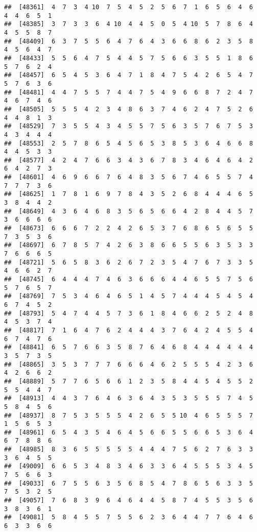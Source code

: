 \documentclass[
]{book}
\begin{document}
\begin{verbatim}
##  [48361]  4  7  3  4 10  7  5  4  5  2  5  6  7  1  6  5  6  4  6  4  4  6  5  1
##  [48385]  3  7  3  3  6  4 10  4  4  5  0  5  4 10  5  7  8  6  4  4  5  5  8  7
##  [48409]  6  3  7  5  5  6  4  7  6  4  3  6  6  8  6  2  3  5  8  4  5  6  4  7
##  [48433]  5  5  6  4  7  5  4  4  5  7  5  6  6  3  5  5  1  8  6  5  7  6  2  4
##  [48457]  6  5  4  5  3  6  4  7  1  8  4  7  5  4  2  6  5  4  7  5  7  6  3  6
##  [48481]  4  4  7  5  5  7  4  4  7  5  4  9  6  6  8  7  2  4  7  4  6  7  4  6
##  [48505]  5  5  5  4  2  3  4  8  6  3  7  4  6  2  4  7  5  2  6  4  4  8  1  3
##  [48529]  7  3  5  5  4  3  4  5  5  7  5  6  3  5  7  6  7  5  3  4  3  4  4  4
##  [48553]  2  5  7  8  6  5  4  5  6  5  3  8  5  3  6  4  6  6  8  4  4  5  3  3
##  [48577]  4  2  4  7  6  6  3  4  3  6  7  8  3  4  6  4  6  4  2  6  4  2  7  3
##  [48601]  4  6  9  6  6  7  6  4  8  3  5  6  7  4  6  5  5  7  4  7  7  7  3  6
##  [48625]  1  7  8  1  6  9  7  8  4  3  5  2  6  8  4  4  4  6  5  3  8  4  4  2
##  [48649]  4  3  6  4  6  8  3  5  6  5  6  6  4  2  8  4  4  5  7  3  6  6  6  6
##  [48673]  6  6  6  7  2  2  4  2  6  5  3  7  6  8  6  5  6  5  5  7  3  5  3  6
##  [48697]  6  7  8  5  7  4  2  6  3  8  6  6  5  5  6  3  5  3  3  7  6  6  6  5
##  [48721]  5  6  5  8  3  6  2  6  7  2  3  5  4  7  6  7  3  3  5  4  6  6  2  7
##  [48745]  6  4  4  4  7  4  6  3  6  6  6  4  4  6  5  5  7  5  6  5  7  6  5  7
##  [48769]  7  5  3  4  6  4  6  5  1  4  5  7  4  4  4  5  4  5  4  6  7  4  5  2
##  [48793]  5  4  7  4  4  5  7  3  6  1  8  4  6  6  2  5  2  4  8  4  5  3  7  4
##  [48817]  7  1  6  4  7  6  2  4  4  4  3  7  6  4  2  4  5  5  4  6  7  4  7  6
##  [48841]  6  5  7  6  6  3  5  8  7  6  4  6  8  4  4  4  4  4  4  3  5  7  3  5
##  [48865]  3  5  3  7  7  7  6  6  6  4  6  2  5  5  5  4  2  3  6  4  2  6  6  2
##  [48889]  5  7  7  6  5  6  6  1  2  3  5  8  4  4  5  4  5  5  2  5  5  4  4  7
##  [48913]  4  4  3  7  6  4  6  3  6  4  3  5  3  5  5  5  7  4  5  5  8  4  5  6
##  [48937]  8  7  5  3  5  5  5  4  2  6  5  5 10  4  6  5  5  5  7  1  5  6  5  3
##  [48961]  6  5  4  3  5  4  6  4  5  6  6  5  5  6  6  5  3  6  4  6  7  8  8  6
##  [48985]  8  3  6  5  5  5  5  5  4  4  4  7  5  6  2  7  6  3  3  3  6  4  5  5
##  [49009]  6  6  5  3  4  8  3  4  6  3  3  6  4  5  5  5  3  4  5  7  5  6  6  3
##  [49033]  6  7  5  5  6  3  5  6  8  5  4  7  8  6  5  6  3  3  5  7  5  3  2  5
##  [49057]  7  6  8  3  9  6  4  6  4  4  5  8  7  4  5  5  3  5  6  3  8  3  6  1
##  [49081]  5  8  4  5  5  7  5  5  6  2  3  6  4  4  7  7  6  4  6  6  3  3  6  6

\end{verbatim}
\end{document}

